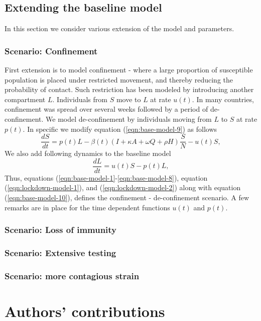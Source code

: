 \documentclass[authoryear,preprint]{elsarticle}
\begin{document}
\subsection{Extending the baseline model}
In this section we consider various extension of the model and parameters. 

\subsubsection{Scenario: Confinement}
First extension is to model confinement - where a large proportion of susceptible population is placed under restricted movement, and thereby reducing the probability of contact. Such restriction has been modeled by introducing another compartment $L$. Individuals from $S$ move to $L$ at rate $u(t)$. In many countries, confinement was spread over several weeks followed by a period of de-confinement. We model de-confinement by individuals moving from $L$ to $S$ at rate $p(t)$. In specific we modify equation (\ref{eqn:base-model-9}) as follows
\begin{equation}
\frac{dS}{dt} = p(t)L -\beta(t) \left( I + \kappa A + \omega Q + \rho H \right) \frac{S}{N} - u(t)S,
\label{eqn:lockdown-model-1}
\end{equation}
%
%
We also add following dynamics to the baseline model 
\begin{equation}
\frac{dL}{dt} = u(t)S - p(t)L,
\label{eqn:lockdown-model-2}
\end{equation}
Thus, equations (\ref{eqn:base-model-1}-\ref{eqn:base-model-8}), equation (\ref{eqn:lockdown-model-1}), and (\ref{eqn:lockdown-model-2}) along with equation (\ref{eqn:base-model-10}), defines the confinement - de-confinement scenario. A few remarks are in place for the time dependent functions $u(t)$ and $p(t)$.

\subsubsection{Scenario: Loss of immunity}

\subsubsection{Scenario: Extensive testing}

\subsubsection{Scenario: more contagious strain }

\section*{Authors' contributions}
\label{SEC5}


	
\end{document}
